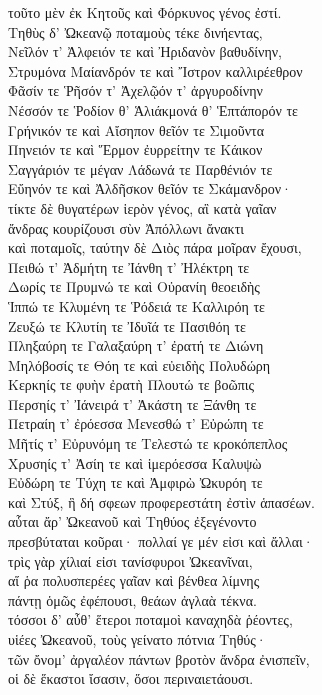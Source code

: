 \begin{pages}
\begin{Leftside}
{\minion\Para}
τοῦτο μὲν ἐκ Κητοῦς καὶ Φόρκυνος γένος ἐστί. \\
Τηθὺς δ' Ὠκεανῷ ποταμοὺς τέκε δινήεντας,\\
Νεῖλόν τ' Ἀλφειόν τε καὶ Ἠριδανὸν βαθυδίνην,\\
Στρυμόνα Μαίανδρόν τε καὶ Ἴστρον καλλιρέεθρον\\
Φᾶσίν τε Ῥῆσόν τ' Ἀχελῷόν τ' ἀργυροδίνην \\
Νέσσόν τε Ῥοδίον θ' Ἁλιάκμονά θ' Ἑπτάπορόν τε\\
Γρήνικόν τε καὶ Αἴσηπον θεῖόν τε Σιμοῦντα\\
Πηνειόν τε καὶ Ἕρμον ἐυρρείτην τε Κάικον\\
Σαγγάριόν τε μέγαν Λάδωνά τε Παρθένιόν τε\\
Εὔηνόν τε καὶ Ἀλδῆσκον θεῖόν τε Σκάμανδρον· \\
τίκτε δὲ θυγατέρων ἱερὸν γένος, αἳ κατὰ γαῖαν\\
ἄνδρας κουρίζουσι σὺν Ἀπόλλωνι ἄνακτι\\
καὶ ποταμοῖς, ταύτην δὲ Διὸς πάρα μοῖραν ἔχουσι,\\
Πειθώ τ' Ἀδμήτη τε Ἰάνθη τ' Ἠλέκτρη τε\\
Δωρίς τε Πρυμνώ τε καὶ Οὐρανίη θεοειδὴς \\
Ἱππώ τε Κλυμένη τε Ῥόδειά τε Καλλιρόη τε\\
Ζευξώ τε Κλυτίη τε Ἰδυῖά τε Πασιθόη τε\\
Πληξαύρη τε Γαλαξαύρη τ' ἐρατή τε Διώνη\\
Μηλόβοσίς τε Θόη τε καὶ εὐειδὴς Πολυδώρη \\
Κερκηίς τε φυὴν ἐρατὴ Πλουτώ τε βοῶπις \\
Περσηίς τ' Ἰάνειρά τ' Ἀκάστη τε Ξάνθη τε\\
Πετραίη τ' ἐρόεσσα Μενεσθώ τ' Εὐρώπη τε\\
Μῆτίς τ' Εὐρυνόμη τε Τελεστώ τε κροκόπεπλος\\
Χρυσηίς τ' Ἀσίη τε καὶ ἱμερόεσσα Καλυψὼ\\
Εὐδώρη τε Τύχη τε καὶ Ἀμφιρὼ Ὠκυρόη τε \\
καὶ Στύξ, ἣ δή σφεων προφερεστάτη ἐστὶν ἁπασέων.\\
αὗται ἄρ' Ὠκεανοῦ καὶ Τηθύος ἐξεγένοντο\\
πρεσβύταται κοῦραι· πολλαί γε μέν εἰσι καὶ ἄλλαι·\\
τρὶς γὰρ χίλιαί εἰσι τανίσφυροι Ὠκεανῖναι,\\
αἵ ῥα πολυσπερέες γαῖαν καὶ βένθεα λίμνης \\
πάντῃ ὁμῶς ἐφέπουσι, θεάων ἀγλαὰ τέκνα. \\
τόσσοι δ' αὖθ' ἕτεροι ποταμοὶ καναχηδὰ ῥέοντες,\\
υἱέες Ὠκεανοῦ, τοὺς γείνατο πότνια Τηθύς· \\
τῶν ὄνομ' ἀργαλέον πάντων βροτὸν ἄνδρα ἐνισπεῖν, \\
οἱ δὲ ἕκαστοι ἴσασιν, ὅσοι περιναιετάουσι.  \\


\end{Leftside}
\end{pages}
